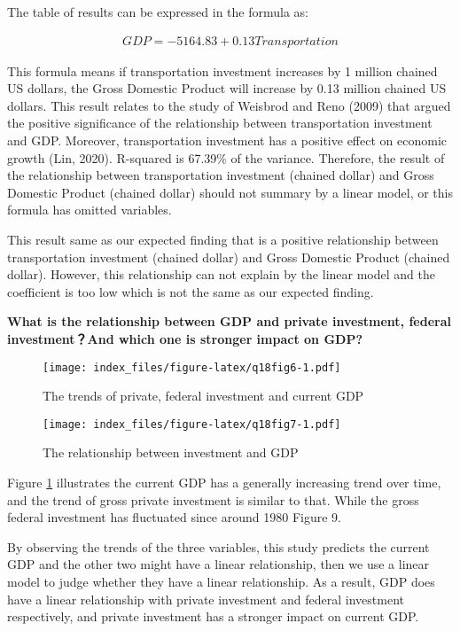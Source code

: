\documentclass[
]{article}
\begin{document}
The table of results can be expressed in the formula as:

\[
\begin{align*}
{GDP} = -5164.83 + 0.13{Transportation}
\end{align*}
\]

This formula means if transportation investment increases by 1 million chained US dollars, the Gross Domestic Product will increase by 0.13 million chained US dollars. This result relates to the study of Weisbrod and Reno (2009) that argued the positive significance of the relationship between transportation investment and GDP. Moreover, transportation investment has a positive effect on economic growth (Lin, 2020). R-squared is 67.39\% of the variance. Therefore, the result of the relationship between transportation investment (chained dollar) and Gross Domestic Product (chained dollar) should not summary by a linear model, or this formula has omitted variables.

This result same as our expected finding that is a positive relationship between transportation investment (chained dollar) and Gross Domestic Product (chained dollar). However, this relationship can not explain by the linear model and the coefficient is too low which is not the same as our expected finding.

\textbf{What is the relationship between GDP and private investment, federal investment？And which one is stronger impact on GDP?}

\begin{figure}
\centering
\texttt{[image: index\_files/figure-latex/q18fig6-1.pdf]}
\caption{\label{fig:q18fig6}The trends of private, federal investment and current GDP}
\end{figure}

\begin{figure}
\centering
\texttt{[image: index\_files/figure-latex/q18fig7-1.pdf]}
\caption{\label{fig:q18fig7}The relationship between investment and GDP}
\end{figure}

Figure \ref{fig:q18fig6} illustrates the current GDP has a generally increasing trend over time, and the trend of gross private investment is similar to that. While the gross federal investment has fluctuated since around 1980 Figure 9.

By observing the trends of the three variables, this study predicts the current GDP and the other two might have a linear relationship, then we use a linear model to judge whether they have a linear relationship. As a result, GDP does have a linear relationship with private investment and federal investment respectively, and private investment has a stronger impact on current GDP.
\end{document}
